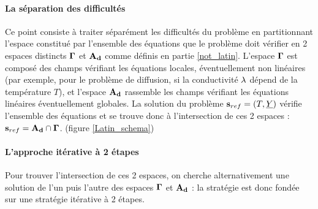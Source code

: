 \documentclass[12pt,a4paper]{report}
\begin{document}
  \paragraph{La séparation des difficultés }

Ce point consiste à traiter séparément les difficultés du problème en partitionnant l'espace constitué par l'ensemble des équations que le problème doit vérifier en 2 espaces distincts $\mbox{$\boldsymbol{\Gamma}$}$ et $\mathbf{A_d}$ comme définis en partie \ref{not_latin}. L'espace $\mbox{$\boldsymbol{\Gamma}$}$ est composé des champs vérifiant les équations locales, éventuellement non linéaires (par exemple, pour le problème de diffusion, si la conductivité $\lambda$ dépend de la température $T$), et l'espace $\mathbf{A_d}$ rassemble les champs vérifiant les équations linéaires éventuellement globales.
La solution du problème $\mathbf{s}_{ref}=(T,\underline{Y})$ vérifie l'ensemble des équations et se trouve donc à l'intersection de ces 2 espaces : $\mathbf{s}_{ref} = \mathbf{A_d} \cap \mbox{$\boldsymbol{\Gamma}$}$. (figure \ref{Latin_schema})

  \paragraph{L'approche itérative à 2 étapes }

Pour trouver l'intersection de ces 2 espaces, on cherche alternativement une solution de l'un puis l'autre des espaces $\mbox{$\boldsymbol{\Gamma}$}$ et $\mathbf{A_d}$ : la stratégie est donc fondée sur une stratégie itérative à 2 étapes.\\ 
\end{document}

